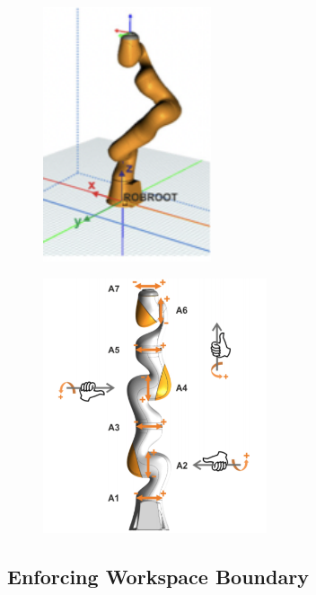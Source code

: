 \documentclass[headsepline,footinclude=false,fontsize=11pt,paper=a4,listof=totoc,bibliography=totoc,BCOR=12mm,DIV=14]{scrbook}
\begin{document}
\begin{figure} [h]
\centering
\begin{minipage}{.4\textwidth}
  \centering
  \includegraphics[height=7.5cm]{images/kuka_coosy}
  \label{img:kuka_coosy}
\end{minipage}
\begin{minipage}{.4\textwidth}
  \centering
  \includegraphics[height=7.5cm]{images/kuka_convention}
  \label{img:kuka_convention}
\end{minipage}
\end{figure}

\subsection{Enforcing Workspace Boundary}
\end{document}
